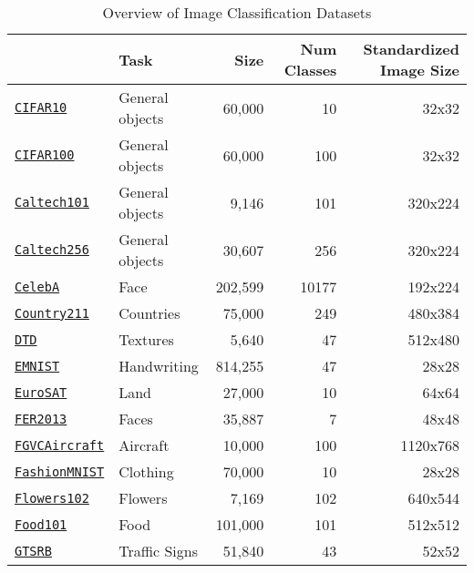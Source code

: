 \begin{table}[htbp]
\centering
\caption{Overview of Image Classification Datasets}
\label{tab:datasets}
\begin{tabular}{llrrr}
\toprule
 & Task & Size & Num Classes & Standardized Image Size \\
\midrule
\href{https://www.cs.toronto.edu/~kriz/cifar.html}{\texttt{CIFAR10}} & General objects & 60,000 & 10 & 32x32 \\
\href{https://www.cs.toronto.edu/~kriz/cifar.html}{\texttt{CIFAR100}} & General objects & 60,000 & 100 & 32x32 \\
\href{https://data.caltech.edu/records/mzrjq-6wc02}{\texttt{Caltech101}} & General objects & 9,146 & 101 & 320x224 \\
\href{https://data.caltech.edu/records/20087}{\texttt{Caltech256}} & General objects & 30,607 & 256 & 320x224 \\
\href{https://mmlab.ie.cuhk.edu.hk/projects/CelebA.html}{\texttt{CelebA}} & Face & 202,599 & 10177 & 192x224 \\
\href{https://github.com/openai/CLIP/blob/main/data/country211.md}{\texttt{Country211}} & Countries & 75,000 & 249 & 480x384 \\
\href{https://www.robots.ox.ac.uk/~vgg/data/dtd/}{\texttt{DTD}} & Textures & 5,640 & 47 & 512x480 \\
\href{https://www.westernsydney.edu.au/icns/resources/reproducible_research3/publication_support_materials2/emnist}{\texttt{EMNIST}} & Handwriting & 814,255 & 47 & 28x28 \\
\href{https://github.com/phelber/eurosat}{\texttt{EuroSAT}} & Land & 27,000 & 10 & 64x64 \\
\href{https://www.kaggle.com/c/challenges-in-representation-learning-facial-expression-recognition-challenge}{\texttt{FER2013}} & Faces & 35,887 & 7 & 48x48 \\
\href{https://www.robots.ox.ac.uk/~vgg/data/fgvc-aircraft/}{\texttt{FGVCAircraft}} & Aircraft & 10,000 & 100 & 1120x768 \\
\href{https://github.com/zalandoresearch/fashion-mnist}{\texttt{FashionMNIST}} & Clothing & 70,000 & 10 & 28x28 \\
\href{https://www.robots.ox.ac.uk/~vgg/data/flowers/102/}{\texttt{Flowers102}} & Flowers & 7,169 & 102 & 640x544 \\
\href{https://data.vision.ee.ethz.ch/cvl/datasets_extra/food-101/}{\texttt{Food101}} & Food & 101,000 & 101 & 512x512 \\
\href{https://benchmark.ini.rub.de/}{\texttt{GTSRB}} & Traffic Signs & 51,840 & 43 & 52x52 \\

\end{tabular}
\end{table}

